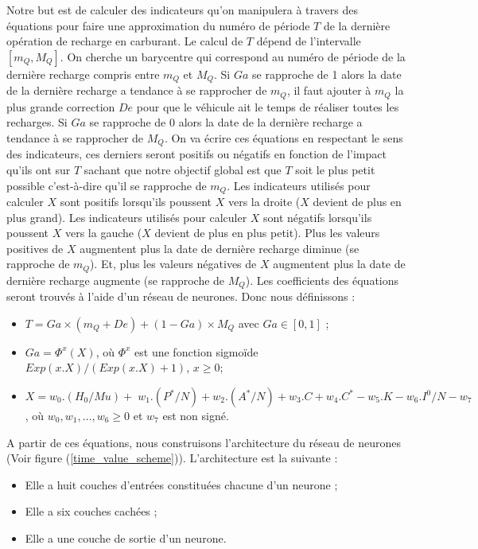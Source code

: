 Notre but est de calculer des indicateurs qu'on manipulera à travers des équations pour faire une approximation du numéro de période $T$ de la dernière opération de recharge en carburant. 
Le calcul de $T$ dépend de l'intervalle $[m_Q,M_Q]$. On cherche un barycentre qui correspond au numéro de période de la dernière recharge compris entre $m_Q$ et $M_Q$. Si $Ga$ se rapproche de 1 alors la date de la dernière recharge a tendance à se rapprocher de $m_Q$, il faut ajouter à $m_Q$ la plus grande correction $De$ pour que le véhicule ait le temps de réaliser toutes les recharges. Si $Ga$ se rapproche de 0 alors la date de la dernière recharge a tendance à se rapprocher de $M_Q$. On va écrire ces équations en respectant le sens des indicateurs, ces derniers seront positifs ou négatifs en fonction de l'impact qu'ils ont sur $T$ sachant que notre objectif global est que $T$ soit le plus petit possible c'est-à-dire qu'il se rapproche de $m_Q$. Les indicateurs utilisés pour calculer $X$ sont positifs lorsqu'ils poussent $X$ vers la droite ($X$ devient de plus en plus grand). Les indicateurs utilisés pour calculer $X$ sont négatifs lorsqu'ils poussent $X$ vers la gauche ($X$ devient de plus en plus petit). Plus les valeurs positives de $X$ augmentent plus la date de dernière recharge diminue (se rapproche de $m_Q$). Et, plus les valeurs négatives de $X$ augmentent plus la date de dernière recharge augmente (se rapproche de $M_Q$). Les coefficients des équations seront trouvés à l'aide d'un réseau de neurones. Donc nous définissons :

\begin{itemize}[label=$\square$]
\item	$T = Ga \times (m_Q + De) + (1 - Ga) \times M_Q$ avec $Ga \in  [0, 1]$ ;
\item	$Ga = \Phi^x(X)$, où $\Phi^x$ est une fonction sigmoïde $Exp(x.X)/(Exp(x.X)+1)$, $x \geq 0$;
\item $X = w_0.(H_0/Mu)+w_1.(P^*/N) +  w_2.(A^*/N) +  w_3.C +  w_4.C^* - w_5.K - w_6.I^0/N - w_7$,  où $w_0, w_1, \dots, w_6 \geq 0$ et $w_7$ est non signé.
\end{itemize}
A partir de ces équations, nous construisons l'architecture du réseau de neurones (Voir figure (\ref{time_value_scheme})). L'architecture est la suivante : 

\begin{itemize}[label=$\square$]
	\item Elle a huit couches d'entrées constituées chacune d'un neurone ;
	\item Elle a six couches cachées ;
	\item Elle a une couche de sortie d'un neurone.
\end{itemize}  


